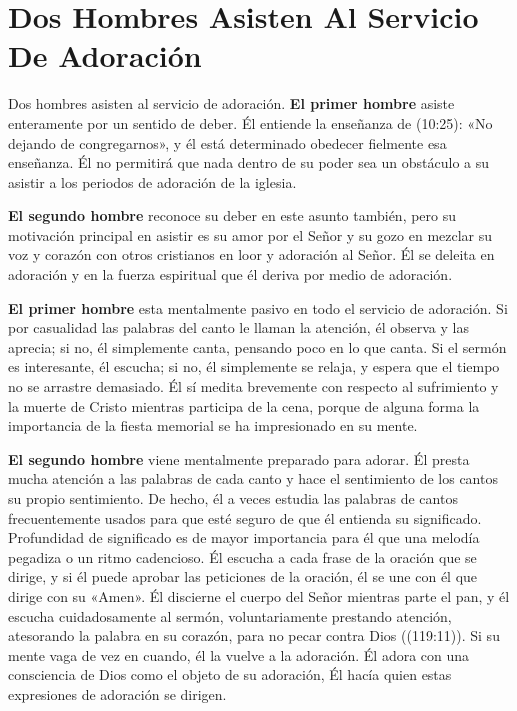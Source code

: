 \documentclass[12pt, twoside, openright]{book}
\begin{document}
\section{Dos Hombres Asisten Al Servicio De Adoración}
Dos hombres asisten al servicio de adoración. \textbf{El primer hombre} asiste enteramente por un sentido de deber. Él entiende la enseñanza de (10:25): «No dejando de congregarnos», y él está determinado obedecer fielmente esa enseñanza. Él no permitirá que nada dentro de su poder sea un obstáculo a su asistir a los periodos de adoración de la iglesia. 

\textbf{El segundo hombre} reconoce su deber en este asunto también, pero su motivación principal en asistir es su amor por el Señor y su gozo en mezclar su voz y corazón con otros cristianos en loor y adoración al Señor. Él se deleita en adoración y en la fuerza espiritual que él deriva por medio de adoración. 

\textbf{El primer hombre} esta mentalmente pasivo en todo el servicio de adoración. Si por casualidad las palabras del canto le llaman la atención, él observa y las aprecia; si no, él simplemente canta, pensando poco en lo que canta. Si el sermón es interesante, él escucha; si no, él simplemente se relaja, y espera que el tiempo no se arrastre demasiado. Él sí medita brevemente con respecto al sufrimiento y la muerte de Cristo mientras participa de la cena, porque de alguna forma la importancia de la fiesta memorial se ha impresionado en su mente. 

\textbf{El segundo hombre} viene mentalmente preparado para adorar. Él presta mucha atención a las palabras de cada canto y hace el sentimiento de los cantos su propio sentimiento. De hecho, él a veces estudia las palabras de cantos frecuentemente usados para que esté seguro de que él entienda su significado. Profundidad de significado es de mayor importancia para él que una melodía pegadiza o un ritmo cadencioso. Él escucha a cada frase de la oración que se dirige, y si él puede aprobar las peticiones de la oración, él se une con él que dirige con su «Amen». Él discierne el cuerpo del Señor mientras parte el pan, y él escucha cuidadosamente al sermón, voluntariamente prestando atención, atesorando la palabra en su corazón, para no pecar contra Dios ((119:11)). Si su mente vaga de vez en cuando, él la vuelve a la adoración. Él adora con una consciencia de Dios como el objeto de su adoración, Él hacía quien estas expresiones de adoración se dirigen. 
\end{document}
